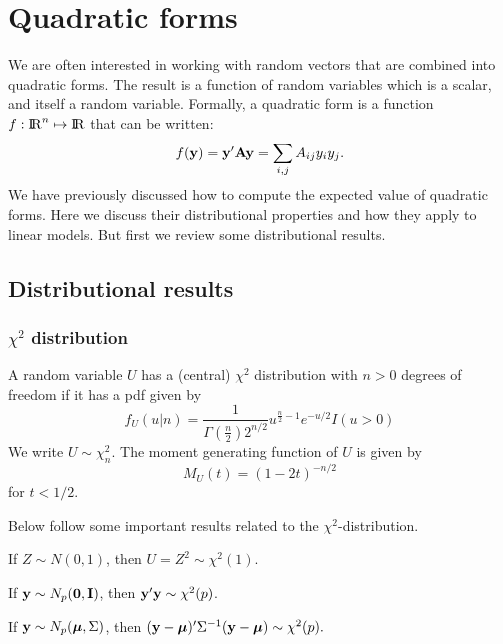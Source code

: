 \section{Quadratic forms}

We are often interested in working with random vectors that are combined into quadratic forms.
The result is a function of random variables which is a scalar, and itself a random variable.
Formally, a quadratic form is a function $ f: {\rm I\!R}^n \mapsto {\rm I\!R}$ that can be written:
$$
f(\mathbf{y}) = \mathbf{y}' \mathbf{A} \mathbf{y} = \sum_{i,j} A_{ij}y_i y_j.
$$
We have previously discussed how to compute the expected value of quadratic forms. 
Here we discuss their distributional properties and how they apply to linear models. But first we review some distributional results.


\subsection{Distributional results}

\subsubsection{$\chi^2$ distribution}

A random variable $U$ has a (central) $\chi^2$ distribution with $n>0$ degrees of freedom if it has a pdf given by
$$
f_U(u|n) =\frac{1}{\Gamma(\frac{n}{2})2^{n/2}}u^{\frac{n}{2}-1}e^{-u/2} I(u>0)
$$
\vb
We write $U \sim \chi^2_n$. The moment generating function of $U$ is given by
$$M_U(t) = (1-2t)^{-n/2}$$ for $t<1/2$.

Below follow some important results related to the $\chi^2$-distribution.

\bstheo
If $Z \sim N(0, 1)$, then $U=Z^2 \sim \chi^2(1)$. 
\estheo


\bstheo
If $\mathbf{y} \sim N_p(\mathbf{0}, \mathbf{I})$, then $\mathbf{y}' \mathbf{y} \sim \chi^2(p)$. 
\estheo


\bstheo
If $\mathbf{y} \sim N_p(\mbox{\boldmath $\mu$}, \Sigma)$, then 
$(\mathbf{y} - \mbox{\boldmath $\mu$})' \Sigma^{-1} (\mathbf{y} - \mbox{\boldmath $\mu$}) \sim \chi^2(p).$
\estheo

%

